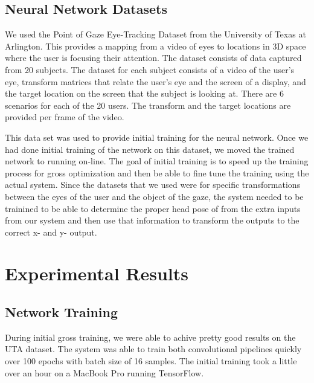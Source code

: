 \documentclass[10pt,twocolumn,letterpaper]{article}
\begin{document}
\subsection{Neural Network Datasets}
We used the Point of Gaze Eye-Tracking Dataset from the University
of Texas at Arlington\cite{eyetracking}. This provides a mapping from
a video of eyes to locations in 3D space where the user is
focusing their attention. The dataset consists of data captured from
20 subjects. The dataset for each subject consists of a video of the
user’s eye, transform matrices that relate the user’s eye and the
screen of a display, and the target location on the screen that the
subject is looking at. There are 6 scenarios for each of the 20
users. The transform and the target locations are provided per frame
of the video.

This data set was used to provide initial training for the neural
network. Once we had done initial training of the network on this
dataset, we moved the trained network to running on-line. The goal of
initial training is to speed up the training process for gross
optimization and then be able to fine tune the training using the
actual system. Since the datasets that we used were for specific
transformations between the eyes of the user and the object of the
gaze, the system needed to be trainined to be able to determine the
proper head pose of from the extra inputs from our system and then use
that information to transform the outputs to the correct x- and y-
output.


\section{Experimental Results}


\subsection{Network Training}
During initial gross training, we were able to achive pretty good
results on the UTA dataset\cite{eyetracking}. The system was able to
train both convolutional pipelines quickly over 100 epochs with batch
size of 16 samples. The initial training took a little over an hour on
a MacBook Pro running TensorFlow.
\end{document}
